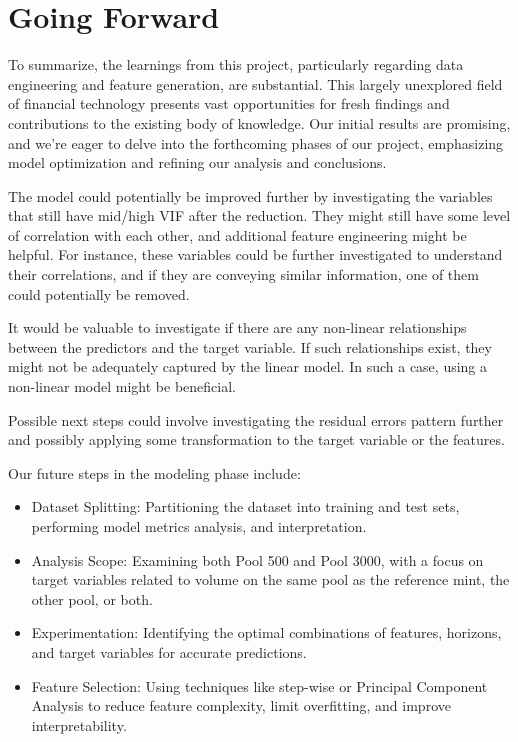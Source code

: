 \documentclass{article}
\begin{document}
\section*{Going Forward}

To summarize, the learnings from this project, particularly regarding data engineering and feature generation, are substantial. This largely unexplored field of financial technology presents vast opportunities for fresh findings and contributions to the existing body of knowledge. Our initial results are promising, and we're eager to delve into the forthcoming phases of our project, emphasizing model optimization and refining our analysis and conclusions.

The model could potentially be improved further by investigating the variables that still have mid/high VIF after the reduction. They might still have some level of correlation with each other, and additional feature engineering might be helpful. For instance, these variables could be further investigated to understand their correlations, and if they are conveying similar information, one of them could potentially be removed.

It would be valuable to investigate if there are any non-linear relationships between the predictors and the target variable. If such relationships exist, they might not be adequately captured by the linear model. In such a case, using a non-linear model might be beneficial.

Possible next steps could involve investigating the residual errors pattern further and possibly applying some transformation to the target variable or the features.

Our future steps in the modeling phase include:

\begin{itemize}
\item Dataset Splitting: Partitioning the dataset into training and test sets, performing model metrics analysis, and interpretation.
\item Analysis Scope: Examining both Pool 500 and Pool 3000, with a focus on target variables related to volume on the same pool as the reference mint, the other pool, or both.
\item Experimentation: Identifying the optimal combinations of features, horizons, and target variables for accurate predictions.
\item Feature Selection: Using techniques like step-wise or Principal Component Analysis to reduce feature complexity, limit overfitting, and improve interpretability.
\end{itemize}
\end{document}
